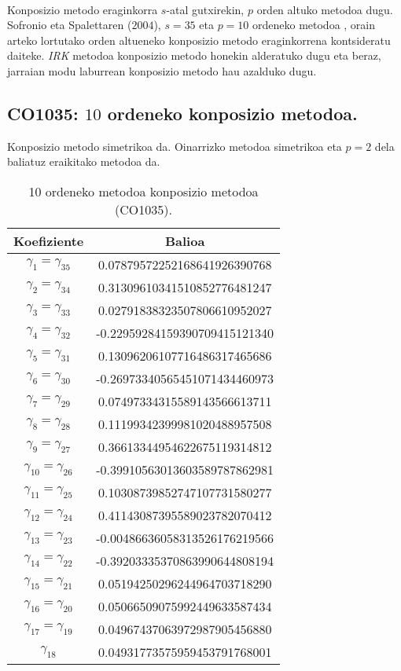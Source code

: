 \paragraph*{} Konposizio metodo eraginkorra $s$-atal gutxirekin, $p$ orden altuko metodoa dugu. Sofronio eta Spalettaren ($2004$), $s=35$ eta $p=10$ ordeneko metodoa \cite{Sofroniou2005}, orain arteko lortutako orden altueneko konposizio metodo eraginkorrena kontsideratu daiteke. \emph{IRK} metodoa konposizio metodo honekin alderatuko dugu eta beraz, jarraian modu laburrean konposizio metodo hau azalduko dugu.     

\subsection{CO1035: $10$ ordeneko konposizio metodoa.}

Konposizio metodo simetrikoa da. Oinarrizko metodoa simetrikoa eta $p=2$ dela baliatuz eraikitako metodoa da. 

\begin{table}
\caption[C01035 konposizio metodoa.] 
{\small{10 ordeneko metodoa konposizio metodoa (CO1035).}}
\label{tab:31}       %
\begin{tabular}{ c c } 
 \hline
 Koefiziente         &  Balioa \\
 \hline
 $\gamma_1=\gamma_{35}$ & 0.07879572252168641926390768 \\
 $\gamma_2=\gamma_{34}$ & 0.31309610341510852776481247 \\ 
 $\gamma_3=\gamma_{33}$ & 0.02791838323507806610952027 \\
 $\gamma_4=\gamma_{32}$ &-0.22959284159390709415121340 \\ 
 $\gamma_5=\gamma_{31}$ & 0.13096206107716486317465686 \\ 
 $\gamma_6=\gamma_{30}$ & -0.26973340565451071434460973 \\ 
 $\gamma_7=\gamma_{29}$ & 0.07497334315589143566613711 \\ 
 $\gamma_8=\gamma_{28}$ & 0.11199342399981020488957508 \\ 
 $\gamma_9=\gamma_{27}$ & 0.36613344954622675119314812 \\ 
 $\gamma_{10}=\gamma_{26}$ & -0.39910563013603589787862981 \\ 
 $\gamma_{11}=\gamma_{25}$ & 0.10308739852747107731580277 \\
 $\gamma_{12}=\gamma_{24}$ & 0.41143087395589023782070412 \\ 
 $\gamma_{13}=\gamma_{23}$ & -0.00486636058313526176219566 \\ 
 $\gamma_{14}=\gamma_{22}$ & -0.39203335370863990644808194 \\ 
 $\gamma_{15}=\gamma_{21}$ & 0.05194250296244964703718290 \\ 
 $\gamma_{16}=\gamma_{20}$ & 0.05066509075992449633587434 \\ 
 $\gamma_{17}=\gamma_{19}$ & 0.04967437063972987905456880 \\ 
 $\gamma_{18}$ & 0.04931773575959453791768001 \\ 
  \hline
 \end{tabular}
\end{table}


